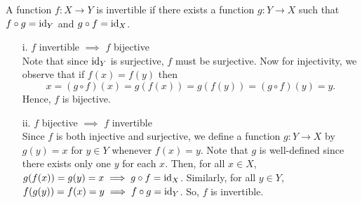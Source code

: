 
\begin{solution}
    A function $f:X\to Y$ is invertible if there exists a
  function $g:Y\to X$ such that $f\circ g= \text{id}_Y$ and
  $g\circ f=\text{id}_X$.
  \begin{enumerate}
    \item[i.]
      $f$ invertible $\implies$ $f$ bijective\\
      Note that since $\text{id}_Y$ is surjective, $f$ must be
      surjective. Now for injectivity, we observe that
      if $f(x) =f(y)$ then $$x=(g\circ f)(x)
      =g(f(x))=g(f(y))=(g\circ f)(y)=y.$$
      Hence, $f$ is bijective.
    \item[ii.]
      $f$ bijective $\implies$ $f$ invertible\\
      Since $f$ is both injective and surjective,
      we define a function $g:Y\to X$ by
      $g(y)=x$ for $y\in Y$
      whenever $f(x)=y$. Note that $g$ is 
      well-defined since there exists only one $y$ for
      each $x$. Then, for all
      $x\in X$,
      $g(f(x)) = g(y)=x \implies g\circ f=\text{id}_X$.
      Similarly, for all $y\in Y$, $f(g(y))=f(x)=y
      \implies f\circ g=\text{id}_Y$. So, $f$ is invertible.
  \end{enumerate}
\end{solution}
